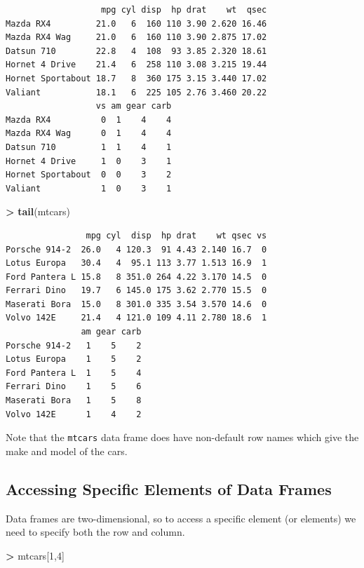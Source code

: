 \documentclass[]{krantz}
\makeatletter
\newenvironment{Shaded}{\begin{snugshade}}{\end{snugshade}}
\newcommand{\KeywordTok}[1]{\textcolor[rgb]{0.27,0.27,0.27}{\textbf{#1}}}
\newcommand{\DecValTok}[1]{\textcolor[rgb]{0.06,0.06,0.06}{#1}}
\newcommand{\StringTok}[1]{\textcolor[rgb]{0.5,0.5,0.5}{#1}}
\newcommand{\OperatorTok}[1]{\textcolor[rgb]{0.43,0.43,0.43}{\textbf{#1}}}
\newcommand{\NormalTok}[1]{#1}
\newenvironment{kframe}{%
\medskip{}
\setlength{\fboxsep}{.8em}
 \def\at@end@of@kframe{}%
 \ifinner\ifhmode%
  \def\at@end@of@kframe{\end{minipage}}%
  \begin{minipage}{\columnwidth}%
 \fi\fi%
 \def\FrameCommand##1{\hskip\@totalleftmargin \hskip-\fboxsep
 \colorbox{shadecolor}{##1}\hskip-\fboxsep
     \hskip-\linewidth \hskip-\@totalleftmargin \hskip\columnwidth}%
 \MakeFramed {\advance\hsize-\width
   \@totalleftmargin\z@ \linewidth\hsize
   \@setminipage}}%
 {\par\unskip\endMakeFramed%
 \at@end@of@kframe}
\renewenvironment{Shaded}{\begin{kframe}}{\end{kframe}}
\makeatother
\begin{document}
\begin{verbatim}
                   mpg cyl disp  hp drat    wt  qsec
Mazda RX4         21.0   6  160 110 3.90 2.620 16.46
Mazda RX4 Wag     21.0   6  160 110 3.90 2.875 17.02
Datsun 710        22.8   4  108  93 3.85 2.320 18.61
Hornet 4 Drive    21.4   6  258 110 3.08 3.215 19.44
Hornet Sportabout 18.7   8  360 175 3.15 3.440 17.02
Valiant           18.1   6  225 105 2.76 3.460 20.22
                  vs am gear carb
Mazda RX4          0  1    4    4
Mazda RX4 Wag      0  1    4    4
Datsun 710         1  1    4    1
Hornet 4 Drive     1  0    3    1
Hornet Sportabout  0  0    3    2
Valiant            1  0    3    1
\end{verbatim}

\begin{Shaded}
\begin{Highlighting}[]
\OperatorTok{>}\StringTok{ }\KeywordTok{tail}\NormalTok{(mtcars)}
\end{Highlighting}
\end{Shaded}

\begin{verbatim}
                mpg cyl  disp  hp drat    wt qsec vs
Porsche 914-2  26.0   4 120.3  91 4.43 2.140 16.7  0
Lotus Europa   30.4   4  95.1 113 3.77 1.513 16.9  1
Ford Pantera L 15.8   8 351.0 264 4.22 3.170 14.5  0
Ferrari Dino   19.7   6 145.0 175 3.62 2.770 15.5  0
Maserati Bora  15.0   8 301.0 335 3.54 3.570 14.6  0
Volvo 142E     21.4   4 121.0 109 4.11 2.780 18.6  1
               am gear carb
Porsche 914-2   1    5    2
Lotus Europa    1    5    2
Ford Pantera L  1    5    4
Ferrari Dino    1    5    6
Maserati Bora   1    5    8
Volvo 142E      1    4    2
\end{verbatim}

Note that the \texttt{mtcars} data frame does have non-default row names
which give the make and model of the cars.

\subsection{Accessing Specific Elements of Data
Frames}\label{accessing-specific-elements-of-data-frames}

Data frames are two-dimensional, so to access a specific element (or
elements) we need to specify both the row and column.

\begin{Shaded}
\begin{Highlighting}[]
\OperatorTok{>}\StringTok{ }\NormalTok{mtcars[}\DecValTok{1}\NormalTok{,}\DecValTok{4}\NormalTok{]}
\end{Highlighting}
\end{Shaded}
\end{document}
